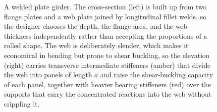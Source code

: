 \begin{figure}[htbp]
\begin{tikzpicture}[scale=1.0]
\end{tikzpicture}
\caption[Welded plate girder: cross-section and stiffened web]{A welded
plate girder. The cross-section (left) is built up from two flange
plates and a web plate joined by longitudinal fillet welds, so the
designer chooses the depth, the flange area, and the web thickness
independently rather than accepting the proportions of a rolled shape.
The web is deliberately slender, which makes it economical in bending
but prone to shear buckling, so the elevation (right) carries transverse
intermediate stiffeners (amber) that divide the web into panels of
length $a$ and raise the shear-buckling capacity of each panel, together
with heavier bearing stiffeners (red) over the supports that carry the
concentrated reactions into the web without crippling it.}
\label{fig:vol03ch08:plate-girder}
\end{figure}

